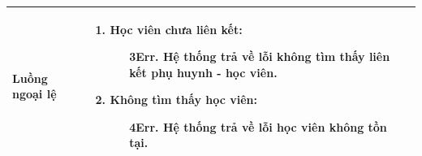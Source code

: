 {\begin{tabularx}{\textwidth}{|>{\raggedright\arraybackslash}X|>{\raggedright\arraybackslash}X|}
\hline
\textbf{Luồng ngoại lệ} &
\begin{enumerate}
    \item \textbf{Học viên chưa liên kết:}
    \begin{enumerate}
        \item[3Err.] Hệ thống trả về lỗi không tìm thấy liên kết phụ huynh - học viên.
    \end{enumerate}
    \item \textbf{Không tìm thấy học viên:}
    \begin{enumerate}
        \item[4Err.] Hệ thống trả về lỗi học viên không tồn tại.
    \end{enumerate}
\end{enumerate} \\
\hline
\end{tabularx}
}
